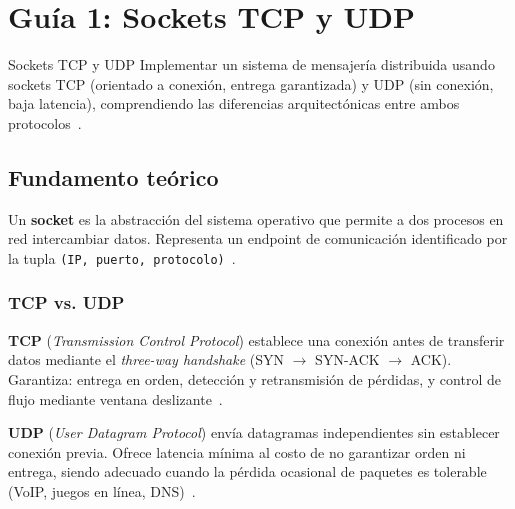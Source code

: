 \documentclass[12pt, a4paper, openany]{book}
\newcounter{paso}[section]
\newcommand{\resetpasos}{\setcounter{paso}{0}}
\begin{document}
	\chapter{Guía 1: Sockets TCP y UDP}
	\resetpasos
	
	\begin{objetivobox}{Sockets TCP y UDP}
		Implementar un sistema de mensajería distribuida usando sockets TCP
		(orientado a conexión, entrega garantizada) y UDP (sin conexión, baja latencia),
		comprendiendo las diferencias arquitectónicas entre ambos protocolos~\parencite{stevens2004}.
	\end{objetivobox}
	
	\section{Fundamento teórico}
	
	Un \textbf{socket} es la abstracción del sistema operativo que permite a dos procesos
	en red intercambiar datos. Representa un endpoint de comunicación identificado por la
	tupla \texttt{(IP, puerto, protocolo)}~\parencite{coulouris2012}.
	
	\subsection{TCP vs. UDP}
	
	\textbf{TCP} (\textit{Transmission Control Protocol}) establece una conexión antes de
	transferir datos mediante el \emph{three-way handshake} (SYN $\to$ SYN-ACK $\to$ ACK).
	Garantiza: entrega en orden, detección y retransmisión de pérdidas, y control de flujo
	mediante ventana deslizante~\parencite{kurose2017}.
	
	\textbf{UDP} (\textit{User Datagram Protocol}) envía datagramas independientes sin
	establecer conexión previa. Ofrece latencia mínima al costo de no garantizar orden ni
	entrega, siendo adecuado cuando la pérdida ocasional de paquetes es tolerable
	(VoIP, juegos en línea, DNS)~\parencite{kurose2017}.
	
\end{document}
